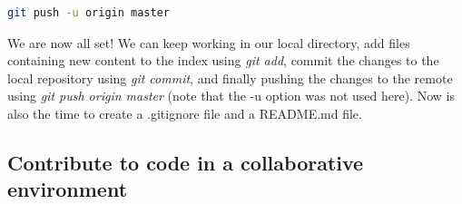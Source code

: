 \begin{lstlisting}[language=bash, caption=Push the local repository to the remote ]
git push -u origin master
\end{lstlisting}

We are now all set! We can keep working in our local directory, add files containing new content to the index using \textit{git add}, commit the changes to the local repository using \textit{git commit}, and finally pushing the changes to the remote using \textit{git push origin master} (note that the -u option was not used here). Now is also the time to create a .gitignore file and a README.md file.
\subsection{Contribute to code in a collaborative environment}